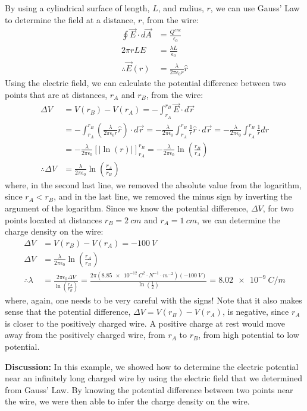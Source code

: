 \begin{example}
By using a cylindrical surface of length, $L$, and radius, $r$, we can use Gauss' Law to determine the field at a distance, $r$, from the wire:
\begin{align*}
\oint \vec E\cdot d\vec A&=\frac{Q^{enc}}{\epsilon_0}\\
2\pi r L E&= \frac{\lambda L}{\epsilon_0}\\
\therefore \vec E(r)&=\frac{\lambda}{2\pi\epsilon_0 r}\hat r
\end{align*}
Using the electric field, we can calculate the potential difference between two points that are at distances, $r_A$ and $r_B$, from the wire:
\begin{align*}
\Delta V &=V(r_B)-V(r_A)=-\int_{r_A}^{r_B}  \vec E\cdot d\vec r\\
&=-\int_{r_A}^{r_B}  \left( \frac{\lambda}{2\pi\epsilon_0 r}\hat r \right)\cdot d\vec r=-\frac{\lambda}{2\pi\epsilon_0}\int_{r_A}^{r_B}   \frac{1}{r}\hat r \cdot d\vec r=-\frac{\lambda}{2\pi\epsilon_0}\int_{r_A}^{r_B}   \frac{1}{r}dr\\
&=-\frac{\lambda}{2\pi\epsilon_0}\left[|\ln(r)|\right]_{r_A}^{r_B} = -\frac{\lambda}{2\pi\epsilon_0}\ln\left(\frac{r_B}{r_A}\right)\\
\therefore\Delta V &=\frac{\lambda}{2\pi\epsilon_0}\ln\left(\frac{r_A}{r_B}\right)
\end{align*}
where, in the second last line, we removed the absolute value from the logarithm, since $r_A<r_B$, and in the last line, we removed the minus sign by inverting the argument of the logarithm. Since we know the potential difference, $\Delta V$, for two points located at distances $r_B=\SI{2}{cm}$ and $r_A=\SI{1}{cm}$, we can determine the charge density on the wire:
\begin{align*}
\Delta V &=V(r_B)-V(r_A)=\SI{-100}{V}\\
\Delta V &=\frac{\lambda}{2\pi\epsilon_0}\ln\left(\frac{r_A}{r_B}\right)\\
\therefore \lambda &= \frac{2\pi\epsilon_0\Delta V}{\ln\left(\frac{r_A}{r_B}\right)}=\frac{2\pi(\SI{8.85e-12}{C^2\cdot N^{-1}\cdot m^{-2}})(\SI{-100}{V})}{\ln\left(\frac{1}{2}\right)}=\SI{8.02e-9}{C/m}
\end{align*}
where, again, one needs to be very careful with the signs! Note that it also makes sense that the potential difference, $\Delta V =V(r_B)-V(r_A)$, is negative, since $r_A$ is closer to the positively charged wire. A positive charge at rest would move away from the positively charged wire, from $r_A$ to $r_B$, from high potential to low potential.

\textbf{Discussion: }In this example, we showed how to determine the electric potential near an infinitely long charged wire by using the electric field that we determined from Gauss' Law. By knowing the potential difference between two points near the wire, we were then able to infer the charge density on the wire.
\end{example}


